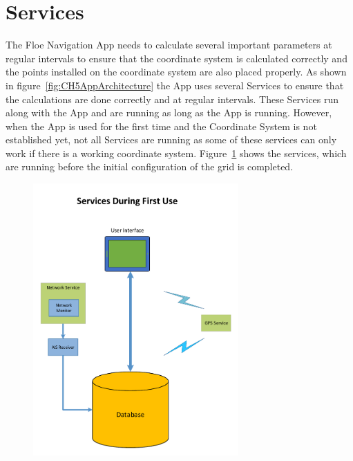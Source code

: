 \section{Services}
\label{sec:sec5_2}
\noindent
%
The Floe Navigation App needs to calculate several important parameters at regular intervals to ensure that the coordinate system is calculated correctly and the points installed on the coordinate system are also placed properly. As shown in figure~\ref{fig:CH5AppArchitecture} the App uses several Services to ensure that the calculations are done correctly and at regular intervals.
\newline
\noindent  
These Services run along with the App and are running as long as the App is running. However, when the App is used for the first time and the Coordinate System is not established yet, not all Services are running as some of these services can only work if there is a working coordinate system. Figure~\ref{fig:CH5AppStartup} shows the services, which are running before the initial configuration of the grid is completed.  
\begin{figure}[h]
	\centering
	\includegraphics[width=0.7\textwidth,height=0.7\textheight]{fig05/AppStartup}
	\label{fig:CH5AppStartup}
\end{figure}
%

